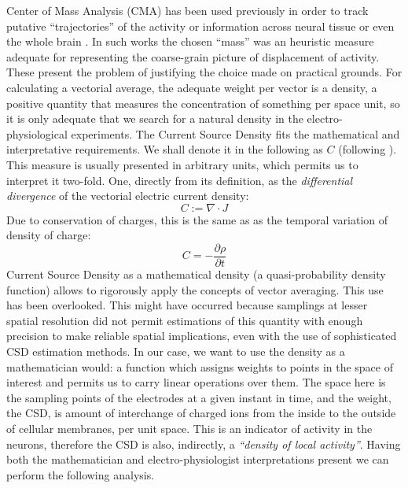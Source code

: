 \documentclass[letterpaper,12pts]{article}
\begin{document}
Center of Mass Analysis (CMA) has been used previously in order to track putative  ``trajectories'' of the activity or information across neural tissue or even the whole brain \cite{Chao05, Chao07, Manjarrez07, Manjarrez09, Cuellar2009}.
In such works the chosen ``mass'' was an heuristic measure adequate for representing the coarse-grain picture of displacement of activity. These present the problem of justifying the choice made on practical grounds. For calculating a vectorial average, the adequate weight per vector is a density, a positive quantity that measures the concentration of something per space unit, so it is only adequate that we search for a natural density in the electro-physiological experiments. The Current Source Density fits the mathematical and interpretative requirements. We shall denote it in the following as $C$ (following \cite{Potworowski2011}).  This measure is usually presented in arbitrary units, which permits us to interpret it two-fold. One, directly from its definition, as the \emph{differential divergence} of the vectorial electric current density:
\begin{equation}
  C:=\nabla \cdot J
\end{equation}
Due to conservation of charges, this is the same as as the temporal variation of density of charge:
\begin{equation}
  C=-\frac{\partial \rho}{\partial t}
\end{equation}
Current Source Density as a mathematical density (a quasi-probability density function)  allows  to rigorously apply the concepts of vector averaging. This use has been overlooked. This might have occurred because  samplings at lesser spatial resolution did not permit estimations of this quantity with enough precision to make reliable spatial implications, even with the use of sophisticated CSD estimation methods. In our case, we want to use the density as a mathematician would: a function which assigns weights to points in the space of interest and permits us to carry linear operations over them.  The space here is the sampling points of the electrodes at a given instant in time, and the weight, the CSD, is amount of interchange of charged ions from the inside to the outside of cellular membranes, per unit space.  This is an indicator of activity in the neurons, therefore the CSD is also, indirectly, a \emph{``density of local activity''}. Having both
the mathematician and electro-physiologist interpretations present we can
perform the following analysis.
\end{document}
